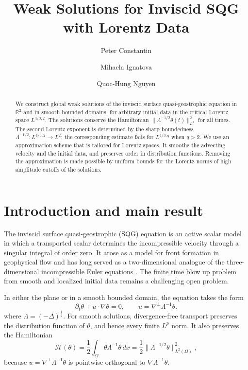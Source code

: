 \documentclass[11pt,reqno]{amsproc}
\title[Weak solutions for inviscid SQG]
{Weak Solutions for Inviscid SQG\\
with Lorentz Data}
\date{}
\author{Peter Constantin}
\author{Mihaela Ignatova}
\author{Quoc-Hung Nguyen}
\newcommand{\Om}{\Omega}
\newcommand{\dd}{\,d}
\begin{document}
\begin{abstract}
We construct global weak solutions of the inviscid surface quasi-geostrophic
equation in $\mathbb R^2$ and in smooth bounded domains, for arbitrary initial
data in the critical Lorentz space $L^{4/3,2}$.  The solutions conserve the
Hamiltonian $\|\Lambda^{-1/2}\theta(t)\|_{L^2}^2$ for all times.  The second Lorentz exponent
is determined by the sharp boundedness
$\Lambda^{-1/2}:L^{4/3,2}\to L^2$; the corresponding estimate fails for
$L^{4/3,q}$ when $q>2$.  We use an approximation scheme that is tailored for Lorentz spaces. It smooths the
advecting velocity and the initial data, and preserves order in distribution functions.   Removing the approximation is made possible by 
uniform bounds for the Lorentz norms of high amplitude cutoffs of the solutions.

\end{abstract}

\maketitle

\section{Introduction and main result}\label{sec:introduction}

The inviscid surface quasi-geostrophic (SQG) equation is an active scalar model
in which a transported scalar determines the incompressible velocity through a
singular integral of order zero.  It arose as a model for front formation in
geophysical flow and has long served as a two-dimensional analogue of the
three-dimensional incompressible Euler equations 
\cite{Constantin1994, ConstantinMajdaTabak1994}.  The finite time blow up problem from smooth and localized initial data remains a challenging 
open problem.

 In either the plane or in a smooth bounded
domain, the equation takes the form
\[
  \partial_t\theta+u\cdot\nabla\theta=0,
  \qquad u=\nabla^\perp\Lambda^{-1}\theta.
\]
where $\Lambda = (-\Delta)^{\frac{1}{2}}$.  
For smooth solutions, divergence-free transport preserves the distribution
function of $\theta$, and hence every finite $L^p$ norm.  It also
preserves the Hamiltonian
\[
  \mathcal H(\theta)
  =\frac12\int_\Om\theta\Lambda^{-1}\theta\dd x
  =\frac12\|\Lambda^{-1/2}\theta\|_{L^2(\Om)}^2,
\]
because $u=\nabla^\perp\Lambda^{-1}\theta$ is pointwise orthogonal to
$\nabla\Lambda^{-1}\theta$.
\end{document}
